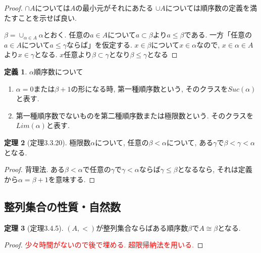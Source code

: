\documentclass[dvipdfmx,a4paper,11pt]{report}
\theoremstyle{definition}
\newtheorem{thm}{定理}
\newtheorem{dfn}[thm]{定義}
\newcommand{\xr}[1]{\textcolor{red}{#1}}
\begin{document}
\begin{proof}
$\cap A$については$A$の最小元がそれにあたる
$\cup A$については順序数の定義を満たすことを示せば良い.

$\beta = \cup_{\alpha \in A }\alpha$とおく.
任意の$a\in A$について$a \subset \beta$より$a \le  \beta$である.
一方「任意の$a\in A$について$a \le \gamma$ならば」を仮定する.
$x \in \beta$について$x \in \alpha$なので, $x \in \alpha \in A$より$x \in \gamma$となる.
$x$任意より$\beta \subset \gamma$となり$\beta \le \gamma$となる
\end{proof}

 \begin{tcolorbox}
 [colback = white, colframe = green!35!black, fonttitle = \bfseries,breakable = true]
\begin{dfn}
$\alpha$順序数について
\begin{enumerate}
\item $\alpha = 0$または$\beta+1$の形になる時, 第一種順序数という, そのクラスを$Suc(\alpha)$と表す. 
\item 第一種順序数でないものを第二種順序数または極限数という. そのクラスを$Lim(\alpha)$と表す. 
\end{enumerate}
\end{dfn}
\end{tcolorbox}

 \begin{tcolorbox}
 [colback = white, colframe = green!35!black, fonttitle = \bfseries,breakable = true]
\begin{thm}[定理3.3.20]
極限数$\alpha$について, 任意の$\beta < \alpha$について, ある$\gamma$で$\beta < \gamma < \alpha$となる.
\end{thm}
\end{tcolorbox}

\begin{proof}
背理法. ある$\beta < \alpha$で任意の$\gamma$で$\gamma < \alpha$ならば$\gamma \le \beta$となるなら, それは定義から$\alpha=\beta+1$を意味する. 
\end{proof}

\subsection{整列集合の性質・自然数}

 \begin{tcolorbox}
 [colback = white, colframe = green!35!black, fonttitle = \bfseries,breakable = true]
\begin{thm}[定理3.4.5]
\label{thm-tanaka-3.4.5}
$(A,<)$が整列集合ならばある順序数$\beta$で$A \cong \beta$となる. 
\end{thm}
\end{tcolorbox}
\begin{proof}
\xr{少々時間がないので後で埋める. 超限帰納法を用いる.}
\end{proof}
\end{document}
